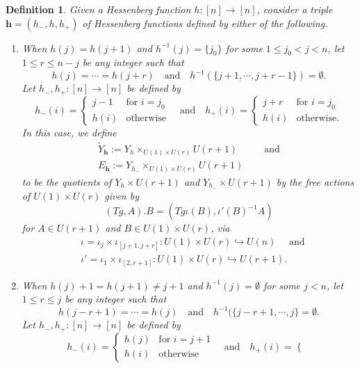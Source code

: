 \documentclass[11pt]{article}
\newtheorem{definition}[theo]{Definition}
\theoremstyle{definition}
\numberwithin{equation}{section}
\numberwithin{equation}{section}
\newcommand\tY{{\widetilde{Y}}}
\newcommand{\aand}{\quad\text{and}\quad}
\newcommand\beq{\begin{equation}}
\newcommand\eeq{\end{equation}}
\newcommand\bh{\mathbf{h}}
\begin{document}
\begin{definition}\label{43}
	Given a Hessenberg function $h:[n]\to [n]$, consider a triple $\bh=(h_-,h,h_+)$ of Hessenberg functions 
	defined by either of the following.
	\begin{enumerate}
		\item When $h(j)=h(j+1)$ and $h^{-1}(j)=\{j_0\}$ for some $1\leq j_0<j<n$, let $1\leq r\leq n-j $ be any integer such that
		\[h(j)=\cdots =h(j+r) \aand h^{-1}(\{j+1,\cdots, j+r-1\})=\emptyset.\] 
		Let $h_-, h_+:[n]\to [n]$ be defined by
		\[h_-(i)=\begin{cases}
			j-1 & \text{for }i=j_0\\
			h(i) &\text{otherwise}
		\end{cases} 
		\aand h_+(i)=\begin{cases}
			j+r &\text{for }i=j_0\\
			h(i) & \text{otherwise.}
		\end{cases} \]
		In this case, we define
		\begin{equation*}
			\begin{split}
				\tY_\bh :=Y_h\times _{U(1)\times U(r)}U(r+1)& \quad \text{ and}\\
				E_\bh:=Y_{h_-}\times_{U(1)\times U(r)}U(r+1)&
			\end{split}
		\end{equation*}
		to be the quotients of $Y_{h}\times U(r+1)$ and $Y_{h_-}\times U(r+1)$ by the free actions of $U(1)\times U(r)$ given by
		\beq \label{36} (Tg,A).B=(Tg\iota(B),\iota'(B)^{-1}A)\eeq 
		for $A\in U(r+1)$ and $B\in U(1)\times U(r)$,
		via 
		\begin{equation*}
			\begin{split}
				&\iota=\iota_j\times \iota_{[j+1,j+r]}:U(1)\times U(r)\hookrightarrow U(n)\quad \text{ and}\\
				&\iota'=\iota_1\times \iota_{[2,r+1]}:U(1)\times U(r)\hookrightarrow U(r+1).
			\end{split}
		\end{equation*}
		\item When $h(j)+1=h(j+1)\neq j+1$ and $h^{-1}(j)=\emptyset$ for some $j<n$, let $1\leq r\leq j$ be any integer such that 
		\[ h(j-r+1)=\cdots =h(j) \aand h^{-1}(\{j-r+1,\cdots, j\}=\emptyset.\]
		Let $h_-,h_+ :[n]\to [n]$ be defined by 
		\[h_-(i)=\begin{cases}
			h(j) &\text{for }i=j+1\\
			h(i) &\text{otherwise}
		\end{cases} 
		\aand h_+(i)=\begin{cases}

\end{cases}\]
\end{enumerate}
\end{definition}
\end{document}
